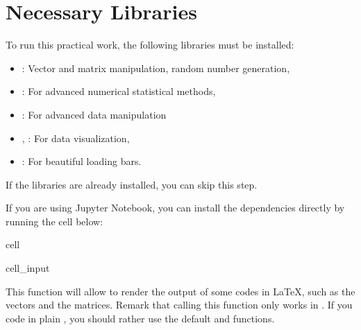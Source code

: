 \documentclass[letterpaper,10pt,english]{jupyterBook}
\begin{document}
\section{Necessary Libraries}
\label{\detokenize{01:necessary-libraries}}
\sphinxAtStartPar
To run this practical work, the following libraries must be installed:
\begin{itemize}
\item {} 
\sphinxAtStartPar
{}: Vector and matrix manipulation, random number generation,

\item {} 
\sphinxAtStartPar
{}: For advanced numerical statistical methods,

\item {} 
\sphinxAtStartPar
{}: For advanced data manipulation

\item {} 
\sphinxAtStartPar
{}, : For data visualization,

\item {} 
\sphinxAtStartPar
{}: For beautiful loading bars.

\end{itemize}

\begin{sphinxShadowBox}
\sphinxstylesidebartitle{}

\sphinxAtStartPar
If the libraries are already installed, you can skip this step.
\end{sphinxShadowBox}

\sphinxAtStartPar
If you are using Jupyter Notebook, you can install the dependencies directly by running the cell below:

\begin{sphinxuseclass}{cell}\begin{sphinxVerbatimInput}

\begin{sphinxuseclass}{cell_input}
\begin{sphinxVerbatim}[commandchars=\\\{\}]
\end{sphinxVerbatim}

\end{sphinxuseclass}\end{sphinxVerbatimInput}

\end{sphinxuseclass}
\begin{sphinxShadowBox}
\sphinxstylesidebartitle{}

\sphinxAtStartPar
This  function will allow to render the output of some codes in LaTeX, such as the vectors and the matrices. Remark that calling this function only works in . If you code in plain , you should rather use the default  and  functions.
\end{sphinxShadowBox}
\end{document}
